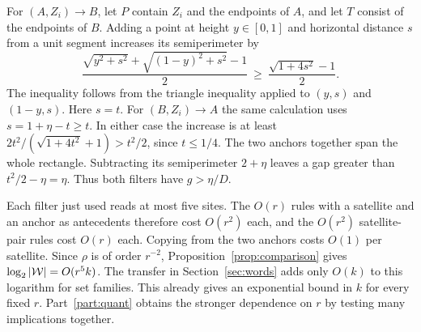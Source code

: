 For \((A,Z_i)\to B\), let \(P\) contain \(Z_i\) and the endpoints of
\(A\), and let \(T\) consist of the endpoints of \(B\). Adding a point
at height \(y\in[0,1]\) and horizontal distance \(s\) from a unit
segment increases its semiperimeter by
\[
  \frac{\sqrt{y^2+s^2}+\sqrt{(1-y)^2+s^2}-1}{2}
     \ \ge\ \frac{\sqrt{1+4s^2}-1}{2} .
\]
The inequality follows from the triangle inequality applied to
\((y,s)\) and \((1-y,s)\). Here \(s=t\). For \((B,Z_i)\to A\) the
same calculation uses \(s=1+\eta-t\ge t\). In either case the
increase is at least
\(2t^2/(\sqrt{1+4t^2}+1)>t^2/2\), since \(t\le1/4\).
The two anchors together span the whole rectangle. Subtracting its
semiperimeter \(2+\eta\) leaves a gap greater than \(t^2/2-\eta=\eta\).
Thus both filters have \(g>\eta/D\).

Each filter just used reads at most five sites. The \(O(r)\) rules
with a satellite and an anchor as antecedents therefore cost \(O(r^2)\)
each, and the \(O(r^2)\) satellite-pair rules cost \(O(r)\) each.
Copying from the two anchors costs \(O(1)\) per satellite.
Since \(\rho\) is of order \(r^{-2}\), Proposition~\ref{prop:comparison}
gives \(\log_2|\mathcal W|=O(r^5 k)\). The transfer in Section~\ref{sec:words}
adds only \(O(k)\) to this logarithm for set families.
This already gives an exponential bound in \(k\) for every fixed \(r\).
Part~\ref{part:quant} obtains the stronger dependence on \(r\) by
testing many implications together.
